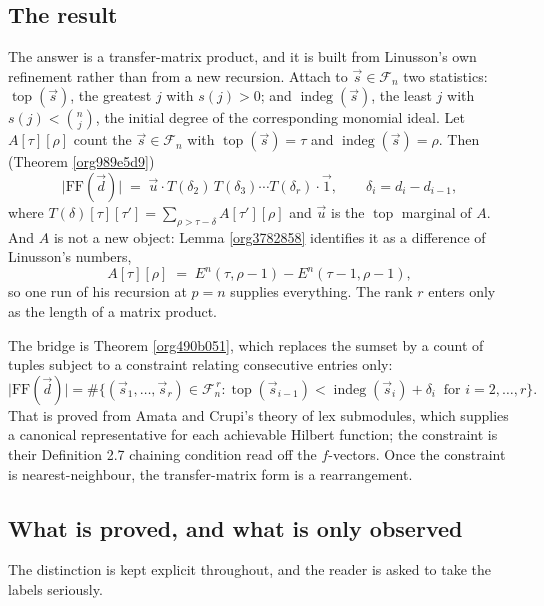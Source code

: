 \documentclass[11pt, a4paper, abstract=yes]{scrartcl}
\theoremstyle{definition}
\theoremstyle{remark}
\theoremstyle{plain}
\newcommand{\vek}[1]{\boldsymbol{#1}}
\newcommand{\indeg}{\operatorname{indeg}}
\newcommand{\tp}{\operatorname{top}}
\renewcommand{\vek}[1]{\vec{#1}}
\begin{document}
\subsection{The result}
\label{sec:org4b32559}

The answer is a transfer-matrix product, and it is built from Linusson's own refinement rather than
from a new recursion. Attach to \(\vek s\in\mathcal F_n\) two statistics: \(\tp(\vek s)\), the greatest \(j\)
with \(s(j)>0\); and \(\indeg(\vek s)\), the least \(j\) with \(s(j)<\binom nj\), the initial degree
of the corresponding monomial ideal. Let \(A[\tau][\rho]\) count the \(\vek s\in\mathcal F_n\) with
\(\tp(\vek s)=\tau\) and \(\indeg(\vek s)=\rho\). Then (Theorem \ref{org989e5d9})
\[
  \lvert\mathrm{FF}(\vek d)\rvert\;=\;\vek u\cdot T(\delta_2)\,T(\delta_3)\cdots T(\delta_r)\cdot\vek 1,
  \qquad \delta_i=d_i-d_{i-1},
\]
where \(T(\delta)[\tau][\tau']=\sum_{\rho>\tau-\delta}A[\tau'][\rho]\) and \(\vek u\) is the \(\tp\)
marginal of \(A\). And \(A\) is not a new object: Lemma \ref{org3782858} identifies it as a difference of
Linusson's numbers,
\[
  A[\tau][\rho]\;=\;E^n(\tau,\rho-1)-E^n(\tau-1,\rho-1),
\]
so one run of his recursion at \(p=n\) supplies everything. The rank \(r\) enters only as the length
of a matrix product.

The bridge is Theorem \ref{org490b051}, which replaces the sumset by a count of tuples subject to a
constraint relating consecutive entries only:
\[
  \lvert\mathrm{FF}(\vek d)\rvert=\#\bigl\lbrace(\vek s_1,\dots,\vek s_r)\in\mathcal F_n^{\,r}:
   \tp(\vek s_{i-1})<\indeg(\vek s_i)+\delta_i\ \text{ for } i=2,\dots,r\bigr\rbrace .
\]
That is proved from Amata and Crupi's theory of lex submodules, which supplies a canonical
representative for each achievable Hilbert function; the constraint is their Definition 2.7 chaining
condition read off the \(f\)-vectors. Once the constraint is nearest-neighbour, the transfer-matrix
form is a rearrangement.
\subsection{What is proved, and what is only observed}
\label{sec:orgc0101f8}

The distinction is kept explicit throughout, and the reader is asked to take the labels seriously.
\end{document}

